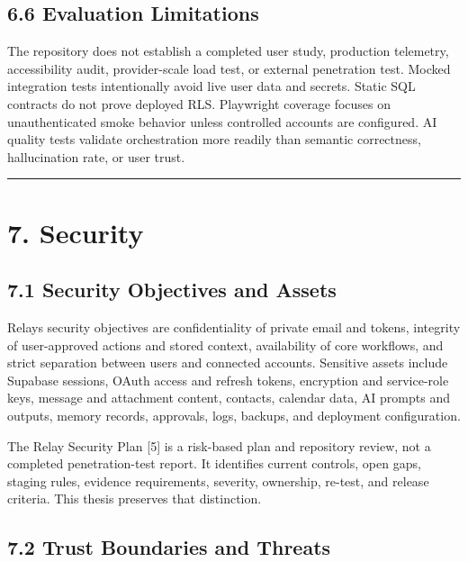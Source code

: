 \documentclass[
]{report}
\begin{document}
\section{6.6 Evaluation Limitations}\label{66-evaluation-limitations}

The repository does not establish a completed user study, production
telemetry, accessibility audit, provider-scale load test, or external
penetration test. Mocked integration tests intentionally avoid live user
data and secrets. Static SQL contracts do not prove deployed RLS.
Playwright coverage focuses on unauthenticated smoke behavior unless
controlled accounts are configured. AI quality tests validate
orchestration more readily than semantic correctness, hallucination
rate, or user trust.

\begin{center}\rule{0.5\linewidth}{0.5pt}\end{center}

\chapter{7. Security}\label{7-security}

\section{7.1 Security Objectives and
Assets}\label{71-security-objectives-and-assets}

Relay\textquotesingle s security objectives are confidentiality of
private email and tokens, integrity of user-approved actions and stored
context, availability of core workflows, and strict separation between
users and connected accounts. Sensitive assets include Supabase
sessions, OAuth access and refresh tokens, encryption and service-role
keys, message and attachment content, contacts, calendar data, AI
prompts and outputs, memory records, approvals, logs, backups, and
deployment configuration.

The Relay Security Plan {[}5{]} is a risk-based plan and repository
review, not a completed penetration-test report. It identifies current
controls, open gaps, staging rules, evidence requirements, severity,
ownership, re-test, and release criteria. This thesis preserves that
distinction.

\section{7.2 Trust Boundaries and
Threats}\label{72-trust-boundaries-and-threats}
\end{document}
